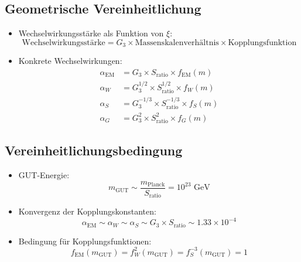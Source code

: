\documentclass[12pt,a4paper]{article}
\begin{document}
	\subsection{Geometrische Vereinheitlichung}
	\begin{itemize}
		\item Wechselwirkungsstärke als Funktion von $\xi$:
		\begin{equation}
			\text{Wechselwirkungsstärke} = G_3 \times \text{Massenskalenverhältnis} \times \text{Kopplungsfunktion}
		\end{equation}
		
		\item Konkrete Wechselwirkungen:
		\begin{align}
			\alpha_{\text{EM}} &= G_3 \times S_{\text{ratio}} \times f_{\text{EM}}(m) \\
			\alpha_W &= G_3^{1/2} \times S_{\text{ratio}}^{1/2} \times f_W(m) \\
			\alpha_S &= G_3^{-1/3} \times S_{\text{ratio}}^{-1/3} \times f_S(m) \\
			\alpha_G &= G_3^2 \times S_{\text{ratio}}^2 \times f_G(m)
		\end{align}
	\end{itemize}
	
	\subsection{Vereinheitlichungsbedingung}
	\begin{itemize}
		\item GUT-Energie:
		\begin{equation}
			m_{\text{GUT}} \sim \frac{m_{\text{Planck}}}{S_{\text{ratio}}} = 10^{23} \text{ GeV}
		\end{equation}
		
		\item Konvergenz der Kopplungskonstanten:
		\begin{equation}
			\alpha_{\text{EM}} \sim \alpha_W \sim \alpha_S \sim G_3 \times S_{\text{ratio}} \sim 1.33 \times 10^{-4}
		\end{equation}
		
		\item Bedingung für Kopplungsfunktionen:
		\begin{equation}
			f_{\text{EM}}(m_{\text{GUT}}) = f_W^2(m_{\text{GUT}}) = f_S^{-3}(m_{\text{GUT}}) = 1
		\end{equation}
	\end{itemize}
\end{document}
